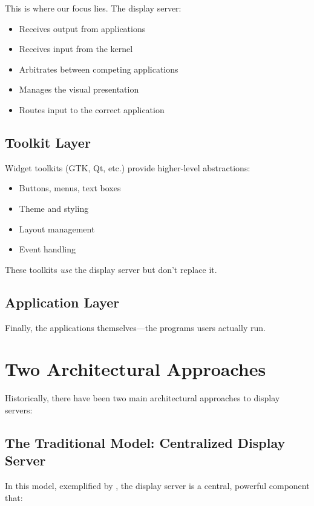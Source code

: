 This is where our focus lies. The display server:

\begin{itemize}[leftmargin=*]
    \item Receives output from applications
    \item Receives input from the kernel
    \item Arbitrates between competing applications
    \item Manages the visual presentation
    \item Routes input to the correct application
\end{itemize}

\subsection{Toolkit Layer}

Widget toolkits (GTK, Qt, etc.) provide higher-level abstractions:

\begin{itemize}[leftmargin=*]
    \item Buttons, menus, text boxes
    \item Theme and styling
    \item Layout management
    \item Event handling
\end{itemize}

These toolkits \textit{use} the display server but don't replace it.

\subsection{Application Layer}

Finally, the applications themselves—the programs users actually run.

\section{Two Architectural Approaches}

Historically, there have been two main architectural approaches to display servers:

\subsection{The Traditional Model: Centralized Display Server}

In this model, exemplified by \xorg{}, the display server is a central, powerful component that:

